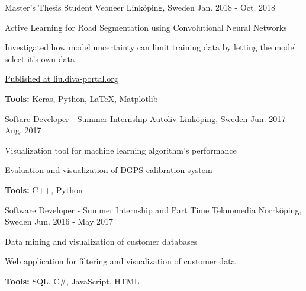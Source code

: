 \begin{cventries}
  \cventry
    {Master's Thesis Student} %
    {Veoneer} %
    {Linköping, Sweden} %
    {Jan. 2018 - Oct. 2018} %
    {
      \begin{cvitems} %
        \item {Active Learning for Road Segmentation using Convolutional Neural Networks}
        \item {Investigated how model uncertainty can limit training data by letting the model select it's own data}
        \item {\href{https://liu.diva-portal.org/smash/get/diva2:1259079/FULLTEXT01.pdf}{Published at liu.diva-portal.org}}
        \item {\textbf{Tools:} Keras, Python, LaTeX, Matplotlib}
      \end{cvitems}
    }

  \cventry
    {Softare Developer - Summer Internship} %
    {Autoliv} %
    {Linköping, Sweden} %
    {Jun. 2017 - Aug. 2017} %
    {
      \begin{cvitems} %
        \item {Visualization tool for machine learning algorithm's performance}
        \item {Evaluation and visualization of DGPS calibration system}
        \item {\textbf{Tools:} C++, Python}
      \end{cvitems}
    }

  \cventry
    {Software Developer - Summer Internship and Part Time} %
    {Teknomedia} %
    {Norrköping, Sweden} %
    {Jun. 2016 - May 2017} %
    {
      \begin{cvitems} %
        \item {Data mining and visualization of customer databases}
        \item {Web application for filtering and visualization of customer data}
        \item {\textbf{Tools:} SQL, C\#, JavaScript, HTML}
      \end{cvitems}
    }

\end{cventries}
